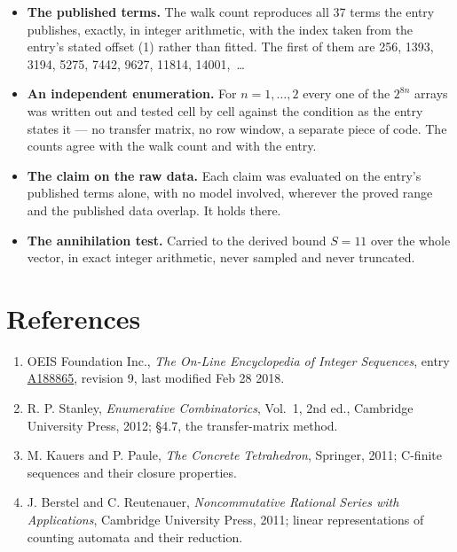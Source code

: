 \documentclass[11pt]{article}
\theoremstyle{definition}
\begin{document}
\begin{itemize}

\item {\bfseries The published terms.} The walk count reproduces all 37 terms the entry publishes, exactly, in integer arithmetic, with the index taken from the entry's stated offset (1) rather than fitted. The first of them are 256, 1393, 3194, 5275, 7442, 9627, 11814, 14001,~\dots

\item {\bfseries An independent enumeration.} For $n = 1,\dots,2$ every one of the $2^{8n}$ arrays was written out and tested cell by cell against the condition as the entry states it --- no transfer matrix, no row window, a separate piece of code. The counts agree with the walk count and with the entry.

\item {\bfseries The claim on the raw data.} Each claim was evaluated on the entry's published terms alone, with no model involved, wherever the proved range and the published data overlap. It holds there.

\item {\bfseries The annihilation test.} Carried to the derived bound $S = 11$ over the whole vector, in exact integer arithmetic, never sampled and never truncated.

\end{itemize}

\section{References}

\begin{enumerate}

\item OEIS Foundation Inc., \emph{The On-Line Encyclopedia of Integer Sequences}, entry \href{https://oeis.org/A188865}{A188865}, revision 9, last modified Feb 28 2018.

\item R. P. Stanley, \emph{Enumerative Combinatorics}, Vol.~1, 2nd ed., Cambridge University Press, 2012; \S4.7, the transfer-matrix method.

\item M. Kauers and P. Paule, \emph{The Concrete Tetrahedron}, Springer, 2011; C-finite sequences and their closure properties.

\item J. Berstel and C. Reutenauer, \emph{Noncommutative Rational Series with Applications}, Cambridge University Press, 2011; linear representations of counting automata and their reduction.

\end{enumerate}
\end{document}
